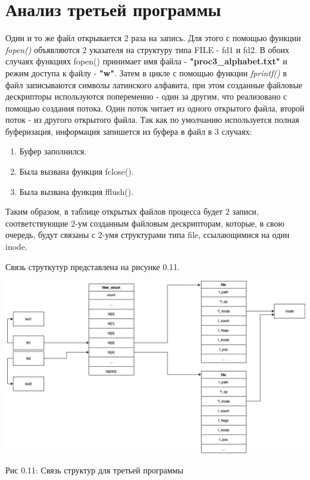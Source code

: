 \documentclass[12pt]{report}
\begin{document}
\section{Анализ третьей программы}

Один и то же файл открывается 2 раза на запись. Для этого с помощью функции \textit{fopen()} объявляются 2 указателя на структуру типа FILE - fd1 и fd2. В обоих случаях функциях fopen() принимает имя файла - \textbf{"proc3\_alphabet.txt"} и режим доступа к файлу - \textbf{"w"}. Затем в цикле с помощью функции \textit{fprintf()} в файл записываются символы латинского алфавита, при этом созданные файловые дескрипторы используются попеременно - один за другим, что реализовано с помощью создания потока. Один поток читает из одного открытого файла, второй поток - из другого открытого файла. Так как по умолчанию используется полная буферизация, информация запишется из буфера в файл в 3 случаях:
\begin{enumerate}
	\item Буфер заполнился.
	\item Была вызвана функция fclose().
	\item Была вызвана функция fflush().
\end{enumerate}
Таким образом, в таблице открытых файлов процесса будет 2 записи, соответствующие 2-ум созданным файловым дескрипторам, которые, в свою очередь, будут связаны с 2-умя структурами типа file, ссылающимися на один inode.

Связь струткутур представлена на рисунке 0.11.

\begin{center}
		\includegraphics[scale=0.45]{pics/proc3.png}
		
			Рис 0.11: Связь структур для третьей программы
\end{center}
\end{document}
